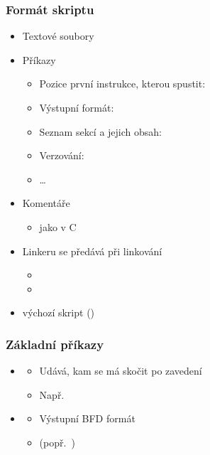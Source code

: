 \begin{frame}
  \frametitle{Formát skriptu}

  \begin{itemize}
    \item Textové soubory
    \item Příkazy
    \begin{itemize}
      \item Pozice první instrukce, kterou spustit: 
      \item Výstupní formát: 
      \item Seznam sekcí a jejich obsah: 
      \item Verzování: 
      \item \dots
    \end{itemize}

    \pause

    \item Komentáře
    \begin{itemize}
      \item \code{/* */} jako v C
    \end{itemize}

    \pause

    \item Linkeru se předává při linkování
    \begin{itemize}
      \item {}
      \item {}
    \end{itemize}

    \pause

    \item {} výchozí skript ()

  \end{itemize}

\end{frame}

\begin{frame}
  \frametitle{Základní příkazy}

  \begin{itemize}
    \item {}
    \begin{itemize}
      \item Udává, kam se má skočit po zavedení
      \item Např.\ 
    \end{itemize}

    \pause

    \item {}
    \begin{itemize}
      \item Výstupní BFD formát
      \item {} (popř.\ )
    \end{itemize}

  \end{itemize}

\end{frame}


